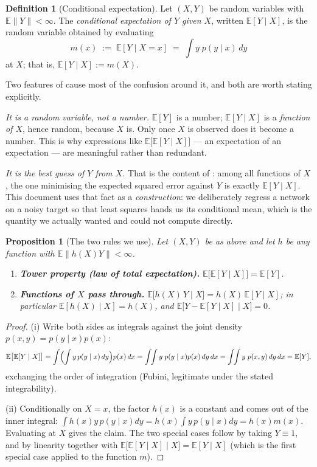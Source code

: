 \documentclass[11pt,a4paper]{report}
\newtheorem{proposition}[proposition]{Proposition}
\theoremstyle{definition}
\newtheorem{definition}[definition]{Definition}
\theoremstyle{remark}
\newcommand{\EE}{\mathbb E}
\begin{document}
\begin{definition}[Conditional expectation]
\label{def:conditional-expectation}
Let $(X,Y)$ be random variables with $\EE\|Y\|<\infty$. The
\emph{conditional expectation of $Y$ given $X$}, written $\EE[Y\mid X]$, is
the random variable obtained by evaluating
\[
m(x) \;:=\; \EE[Y\mid X=x] \;=\; \int y\;p(y\mid x)\,dy
\]
at $X$; that is, $\EE[Y\mid X]:=m(X)$.
\end{definition}

Two features of  cause most of the
confusion around it, and both are worth stating explicitly.

\emph{It is a random variable, not a number.} $\EE[Y]$ is a number;
$\EE[Y\mid X]$ is a \emph{function of $X$}, hence random, because $X$ is.
Only once $X$ is observed does it become a number. This is why expressions
like $\EE\bigl[\EE[Y\mid X]\bigr]$ --- an expectation of an expectation ---
are meaningful rather than redundant.

\emph{It is the best guess of $Y$ from $X$.} That is the content of
: among all functions of $X$, the one minimising
the expected squared error against $Y$ is exactly $\EE[Y\mid X]$. This
document uses that fact as a \emph{construction}: we deliberately regress a
network on a noisy target so that least squares hands us its conditional
mean, which is the quantity we actually wanted and could not compute
directly.

\begin{proposition}[The two rules we use]
\label{prop:cond-exp-rules}
Let $(X,Y)$ be as above and let $h$ be any function with $\EE\|h(X)Y\|<\infty$.
\begin{enumerate}[nosep,label=(\roman*)]
\item \textbf{Tower property (law of total expectation).}
      $\EE\bigl[\EE[Y\mid X]\bigr]=\EE[Y]$.
\item \textbf{Functions of $X$ pass through.}
      $\EE\bigl[h(X)\,Y\;\big|\;X\bigr] = h(X)\,\EE[Y\mid X]$; in
      particular $\EE[h(X)\mid X]=h(X)$, and
      $\EE\bigl[Y-\EE[Y\mid X]\;\big|\;X\bigr]=0$.
\end{enumerate}
\end{proposition}

\begin{proof}
(i) Write both sides as integrals against the joint density
$p(x,y)=p(y\mid x)p(x)$:
\[
\EE\bigl[\EE[Y\mid X]\bigr]
= \int\Bigl(\int y\,p(y\mid x)\,dy\Bigr)p(x)\,dx
= \int\!\!\int y\;p(y\mid x)p(x)\,dy\,dx
= \int\!\!\int y\;p(x,y)\,dy\,dx
= \EE[Y] ,
\]
exchanging the order of integration (Fubini, legitimate under the stated
integrability).

(ii) Conditionally on $X=x$, the factor $h(x)$ is a constant and comes out
of the inner integral:
$\int h(x)y\,p(y\mid x)dy = h(x)\int y\,p(y\mid x)dy = h(x)m(x)$.
Evaluating at $X$ gives the claim. The two special cases follow by taking
$Y\equiv1$, and by linearity together with
$\EE\bigl[\EE[Y\mid X]\mid X\bigr]=\EE[Y\mid X]$ (which is the first
special case applied to the function $m$).
\end{proof}
\end{document}
